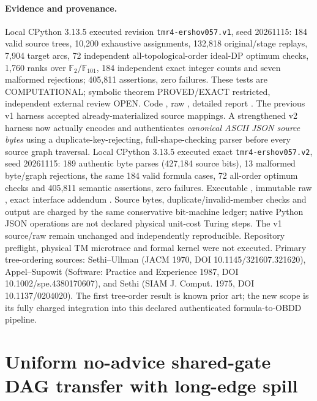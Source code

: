 \documentclass[11pt]{article}
\begin{document}
\paragraph{Evidence and provenance.}
Local CPython 3.13.5 executed revision \texttt{tmr4-ershov057.v1}, seed 20261115: 184 valid source trees, 10,200 exhaustive assignments, 132,818 original/stage replays, 7,904 target arcs, 72 independent all-topological-order ideal-DP optimum checks, 1,760 ranks over $\mathbb F_2/\mathbb F_{101}$, 184 independent exact integer counts and seven malformed rejections; 405,811 assertions, zero failures. These tests are COMPUTATIONAL; symbolic theorem PROVED/EXACT restricted, independent external review OPEN. Code , raw , detailed report . The previous v1 harness accepted already-materialized source mappings. A strengthened v2 harness now actually encodes and authenticates \emph{canonical ASCII JSON source bytes} using a duplicate-key-rejecting, full-shape-checking parser before every source graph traversal. Local CPython 3.13.5 executed exact \texttt{tmr4-ershov057.v2}, seed 20261115: 189 authentic byte parses (427,184 source bits), 13 malformed byte/graph rejections, the same 184 valid formula cases, 72 all-order optimum checks and 405,811 semantic assertions, zero failures. Executable , immutable raw , exact interface addendum . Source bytes, duplicate/invalid-member checks and output are charged by the same conservative bit-machine ledger; native Python JSON operations are not declared physical unit-cost Turing steps. The v1 source/raw remain unchanged and independently reproducible. Repository preflight, physical TM microtrace and formal kernel were not executed. Primary tree-ordering sources: Sethi--Ullman (JACM 1970, DOI 10.1145/321607.321620), Appel--Supowit (Software: Practice and Experience 1987, DOI 10.1002/spe.4380170607), and Sethi (SIAM J. Comput. 1975, DOI 10.1137/0204020). The first tree-order result is known prior art; the new scope is its fully charged integration into this declared authenticated formula-to-OBDD pipeline.


\section{Uniform no-advice shared-gate DAG transfer with long-edge spill}
\end{document}
